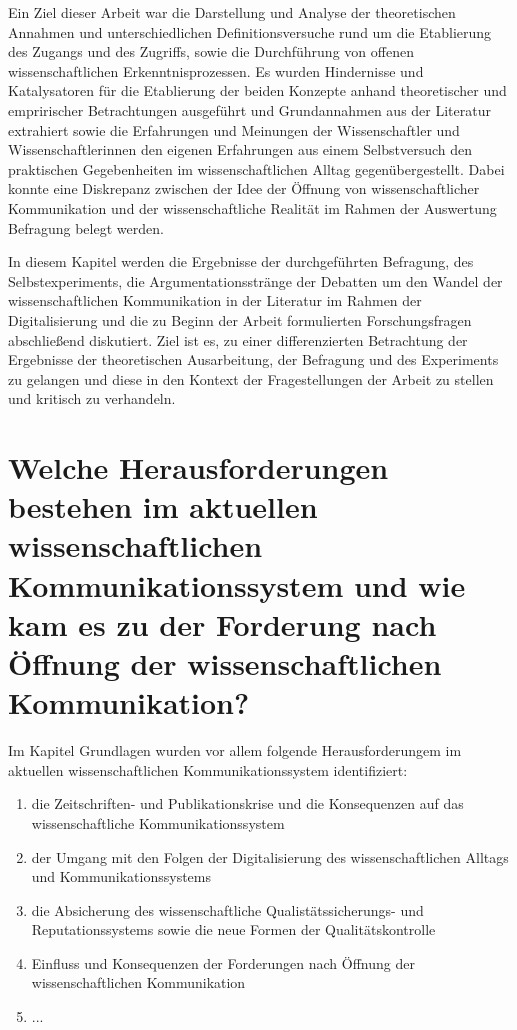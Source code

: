 Ein Ziel dieser Arbeit war die Darstellung und Analyse der theoretischen Annahmen und unterschiedlichen Definitionsversuche rund um die Etablierung des Zugangs und des Zugriffs, sowie die Durchführung von offenen wissenschaftlichen Erkenntnisprozessen. Es wurden Hindernisse und Katalysatoren für die Etablierung der beiden Konzepte anhand theoretischer und empririscher Betrachtungen ausgeführt und Grundannahmen aus der Literatur extrahiert sowie die Erfahrungen und Meinungen der Wissenschaftler und Wissenschaftlerinnen den eigenen Erfahrungen aus einem Selbstversuch den praktischen Gegebenheiten im wissenschaftlichen Alltag gegenübergestellt. Dabei konnte eine Diskrepanz zwischen der Idee der Öffnung von wissenschaftlicher Kommunikation und der wissenschaftliche Realität \cite{Scheliga_2014} im Rahmen der Auswertung Befragung belegt werden.

In diesem Kapitel werden die Ergebnisse der durchgeführten Befragung, des Selbstexperiments, die Argumentationsstränge der Debatten um den Wandel der wissenschaftlichen Kommunikation in der Literatur im Rahmen der Digitalisierung und die zu Beginn der Arbeit formulierten Forschungsfragen abschließend diskutiert. Ziel ist es, zu einer differenzierten Betrachtung der Ergebnisse der theoretischen Ausarbeitung, der Befragung und des Experiments zu gelangen und diese in den Kontext der Fragestellungen der Arbeit zu stellen und kritisch zu verhandeln.

\section{Welche Herausforderungen bestehen im aktuellen wissenschaftlichen Kommunikationssystem und wie kam es zu der Forderung nach Öffnung der wissenschaftlichen Kommunikation?}

Im Kapitel Grundlagen wurden vor allem folgende Herausforderungem im aktuellen wissenschaftlichen Kommunikationssystem identifiziert:
\begin{enumerate}
\item die Zeitschriften- und Publikationskrise und die Konsequenzen auf das wissenschaftliche Kommunikationssystem
\item der Umgang mit den Folgen der Digitalisierung des wissenschaftlichen Alltags und  Kommunikationssystems
\item die Absicherung des wissenschaftliche Qualistätssicherungs- und Reputationssystems sowie die
neue Formen der Qualitätskontrolle
\item Einfluss und Konsequenzen der Forderungen nach Öffnung der wissenschaftlichen Kommunikation
\item ...
\end{enumerate}

